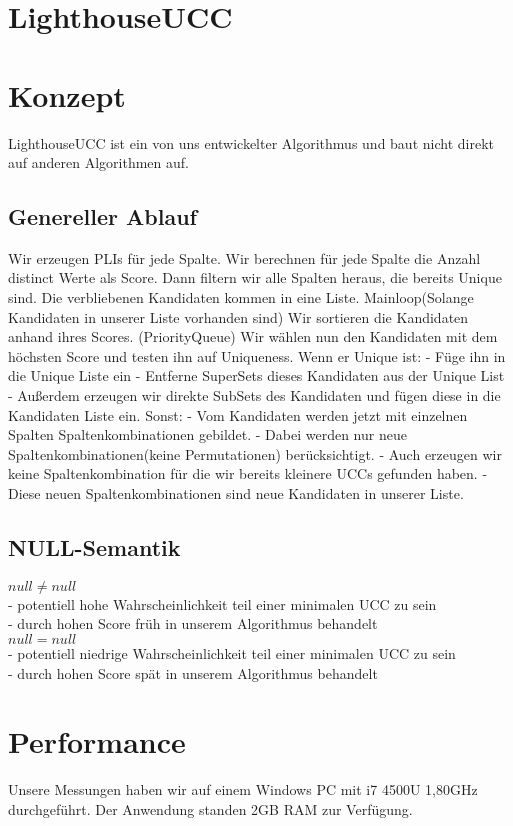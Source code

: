 \documentclass{scrartcl}
\begin{document}
\pagestyle{plain}

\section*{LighthouseUCC}

\section{Konzept}
LighthouseUCC ist ein von uns entwickelter Algorithmus und baut nicht direkt auf anderen Algorithmen auf.
\subsection{Genereller Ablauf}
Wir erzeugen PLIs für jede Spalte. 
Wir berechnen für jede Spalte die Anzahl distinct Werte als Score. 
Dann filtern wir alle Spalten heraus, die bereits Unique sind.
Die verbliebenen Kandidaten kommen in eine Liste.
Mainloop(Solange Kandidaten in unserer Liste vorhanden sind)
Wir sortieren die Kandidaten anhand ihres Scores. (PriorityQueue)
Wir wählen nun den Kandidaten mit dem höchsten Score und testen ihn auf Uniqueness.
Wenn er Unique ist:
- Füge ihn in die Unique Liste ein
- Entferne SuperSets dieses Kandidaten aus der Unique List
- Außerdem erzeugen wir direkte SubSets des Kandidaten und fügen diese in die Kandidaten Liste ein.
Sonst:
- Vom Kandidaten werden jetzt mit einzelnen Spalten Spaltenkombinationen gebildet.
- Dabei werden nur neue Spaltenkombinationen(keine Permutationen) berücksichtigt.
- Auch erzeugen wir keine Spaltenkombination für die wir bereits kleinere UCCs gefunden haben.
- Diese neuen Spaltenkombinationen sind neue Kandidaten in unserer Liste.

\subsection{NULL-Semantik}
$null \neq null$ \\
- potentiell hohe Wahrscheinlichkeit teil einer minimalen UCC zu sein\\
- durch hohen Score früh in unserem Algorithmus behandelt\\
$null = null$ \\
- potentiell niedrige Wahrscheinlichkeit teil einer minimalen UCC zu sein \\
- durch hohen Score spät in unserem Algorithmus behandelt
\section{Performance}
Unsere Messungen haben wir auf einem Windows PC mit i7 4500U 1,80GHz durchgeführt. Der Anwendung standen 2GB RAM zur Verfügung.\\
\end{document}
